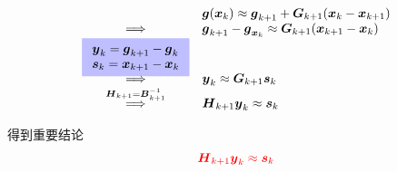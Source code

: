 \[
    \begin{array}{cl}
        & \boldsymbol{g}(\boldsymbol{x}_k)\approx \boldsymbol{g}_{k+1}+\boldsymbol{G}_{k+1}(\boldsymbol{x}_k-\boldsymbol{x}_{k+1})\\
        \implies   & \boldsymbol{g}_{k+1} - \boldsymbol{g}_{\boldsymbol{x}_k}\approx \boldsymbol{G}_{k+1}(\boldsymbol{x}_{k+1}-\boldsymbol{x}_k)\\
        \overset{\colorbox{blue!25}{$\begin{array}{l}
            \boldsymbol{y}_{k} = \boldsymbol{g}_{k+1}-\boldsymbol{g}_{k}\\
            \boldsymbol{s}_{k} = \boldsymbol{x}_{k+1}-\boldsymbol{x}_{k}
        \end{array}$}}{\implies} & \boldsymbol{y}_{k}\approx \boldsymbol{G}_{k+1}\boldsymbol{s}_{k}\\
        \overset{\boldsymbol{H}_{k+1} = \boldsymbol{B}_{k+1}^{-1}}{\implies} & \boldsymbol{H}_{k+1}\boldsymbol{y}_{k}\approx \boldsymbol{s}_{k}
    \end{array}
\]

得到重要结论
\[
    \textcolor{red}{\boldsymbol{H}_{k+1}\boldsymbol{y}_{k}\approx \boldsymbol{s}_{k}}
\]
